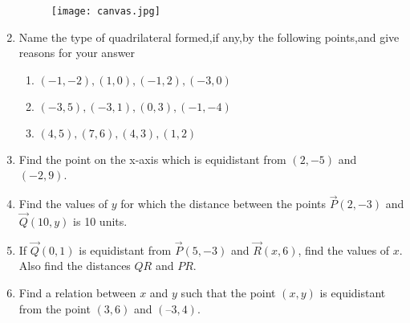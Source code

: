 \documentclass[12pt]{article}
\begin{document}
\begin{enumerate}[label=\thesection.\arabic*,ref=\thesection.\theenumi]
\begin{figure}[!h]
\centering
  \texttt{[image: canvas.jpg]}
 \caption{}
\label{fig:10/7/4/8Fig3}
\end{figure}
\fi
\item Name the type of quadrilateral formed,if any,by the following points,and give reasons for your answer
\begin{enumerate}
\item $(-1,-2),(1,0),(-1,2),(-3,0)$
\item $(-3,5),(-3,1),(0,3),(-1,-4)$
\item $(4,5),(7,6),(4,3),(1,2)$
\end{enumerate}
\solution
		
\item Find the point on the x-axis which is equidistant from $(2,-5)$ and $(-2,9)$.
	\\
\solution
		
\item Find the values of $y$ for which the distance between the points                  $\vec{P}(2,-3)$ and $\vec{Q}(10,y)$ is 10 units.
\item  If $\vec{Q}(0, 1)$ is equidistant from $\vec{P}(5, -3)$ and $\vec{R}(x, 6)$, find the values of $x$. Also find the
distances $QR$ and $PR$.
\item  Find a relation between $x$ and $y$ such that the point $(x,y)$ is equidistant from the point
$(3, 6)$ and $(– 3, 4)$.
	\\
\solution
		

\end{enumerate}
\end{document}
